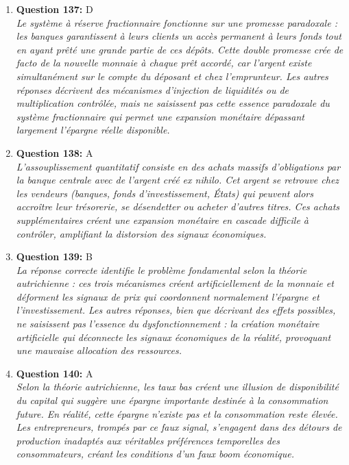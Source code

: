 \documentclass[12pt,a4paper]{article}
\begin{document}
\begin{enumerate}
\item \textbf{Question 137:} D
\\ \textit{Le système à réserve fractionnaire fonctionne sur une promesse paradoxale : les banques garantissent à leurs clients un accès permanent à leurs fonds tout en ayant prêté une grande partie de ces dépôts. Cette double promesse crée de facto de la nouvelle monnaie à chaque prêt accordé, car l'argent existe simultanément sur le compte du déposant et chez l'emprunteur. Les autres réponses décrivent des mécanismes d'injection de liquidités ou de multiplication contrôlée, mais ne saisissent pas cette essence paradoxale du système fractionnaire qui permet une expansion monétaire dépassant largement l'épargne réelle disponible.}

\item \textbf{Question 138:} A
\\ \textit{L'assouplissement quantitatif consiste en des achats massifs d'obligations par la banque centrale avec de l'argent créé ex nihilo. Cet argent se retrouve chez les vendeurs (banques, fonds d'investissement, États) qui peuvent alors accroître leur trésorerie, se désendetter ou acheter d'autres titres. Ces achats supplémentaires créent une expansion monétaire en cascade difficile à contrôler, amplifiant la distorsion des signaux économiques.}

\item \textbf{Question 139:} B
\\ \textit{La réponse correcte identifie le problème fondamental selon la théorie autrichienne : ces trois mécanismes créent artificiellement de la monnaie et déforment les signaux de prix qui coordonnent normalement l'épargne et l'investissement. Les autres réponses, bien que décrivant des effets possibles, ne saisissent pas l'essence du dysfonctionnement : la création monétaire artificielle qui déconnecte les signaux économiques de la réalité, provoquant une mauvaise allocation des ressources.}

\item \textbf{Question 140:} A
\\ \textit{Selon la théorie autrichienne, les taux bas créent une illusion de disponibilité du capital qui suggère une épargne importante destinée à la consommation future. En réalité, cette épargne n'existe pas et la consommation reste élevée. Les entrepreneurs, trompés par ce faux signal, s'engagent dans des détours de production inadaptés aux véritables préférences temporelles des consommateurs, créant les conditions d'un faux boom économique.}


\end{enumerate}
\end{document}
